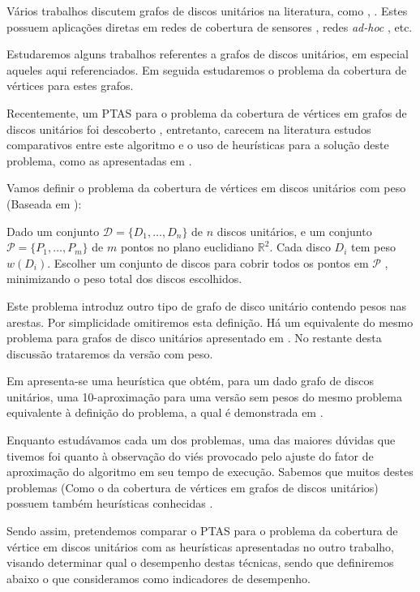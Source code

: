 Vários trabalhos discutem grafos de discos unitários na literatura, como \cite{clark1990unit}, \cite{marathe1995simple}. Estes possuem aplicações diretas em redes de cobertura de sensores \cite{Huang}, redes \textit{ad-hoc} \cite{kuhn2003ad}, etc.

Estudaremos alguns trabalhos referentes a grafos de discos unitários, em especial aqueles aqui referenciados. Em seguida estudaremos o problema da cobertura de vértices para estes grafos.

Recentemente, um PTAS para o problema da cobertura de vértices em grafos de discos unitários foi descoberto \cite{li}, entretanto, carecem na literatura estudos comparativos entre este algoritmo e o uso de heurísticas para a solução deste problema, como as apresentadas em \cite{marathe1995simple}.

Vamos definir o problema da cobertura de vértices em discos unitários com peso (Baseada em \cite{li}):

\begin{definition}
Dado um conjunto $\mathcal{D} = \{D_1, \ldots, D_n\}$ de $n$ discos unitários, e um conjunto $\mathcal{P} = \{P_1, \ldots, P_m\}$ de $m$ pontos no plano euclidiano $\mathbb{R}^2$. Cada disco $D_i$ tem peso $w(D_i)$. Escolher um conjunto de discos para cobrir todos os pontos em $\mathcal{P}$ , minimizando o peso total dos discos escolhidos. 
\end{definition}

Este problema introduz outro tipo de grafo de disco unitário contendo pesos nas arestas. Por simplicidade omitiremos esta definição. Há um equivalente do mesmo problema para grafos de disco unitários apresentado em \cite{li}. No restante desta discussão trataremos da versão com peso.

Em \cite{marathe1995simple} apresenta-se uma heurística que obtém, para um dado grafo de discos unitários, uma 10-aproximação para uma versão sem pesos do mesmo problema equivalente à definição do problema, a qual é demonstrada em \cite{li}.

Enquanto estudávamos cada um dos problemas, uma das maiores dúvidas que tivemos foi quanto à observação do viés provocado pelo ajuste do fator de aproximação do algoritmo em seu tempo de execução. Sabemos que muitos destes problemas (Como o da cobertura de vértices em grafos de discos unitários) possuem também heurísticas conhecidas \cite{marathe1995simple}.

Sendo assim, pretendemos comparar o PTAS para o problema da cobertura de vértice em discos unitários com as heurísticas apresentadas no outro trabalho, visando determinar qual o desempenho destas técnicas, sendo que definiremos abaixo o que consideramos como indicadores de desempenho.

